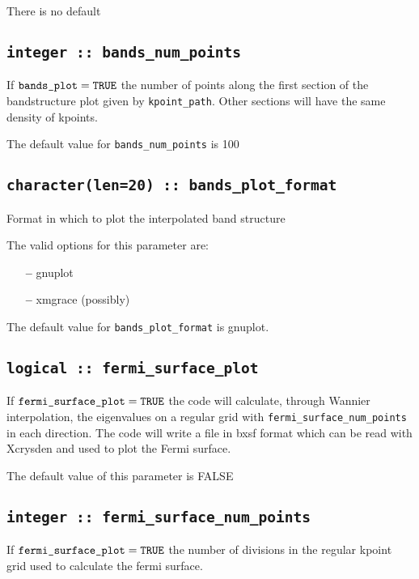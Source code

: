 There is no default

\subsection[bands\_num\_points]{\tt integer :: bands\_num\_points}

If $\verb#bands_plot#=\verb#TRUE#$ the number of points along the first
section of the bandstructure plot given by \verb#kpoint_path#. Other
sections will have the same density of kpoints.

The default value for \verb#bands_num_points# is 100


\subsection[bands\_plot\_format]{\tt character(len=20) :: bands\_plot\_format}

Format in which to plot the interpolated band structure

The valid options for this parameter are:
\begin{itemize}
\item[{\bf --}] gnuplot
\item[{\bf --}] xmgrace (possibly)
\end{itemize}

The default value for \verb#bands_plot_format# is gnuplot.


\subsection[fermi\_surface\_plot]{\tt logical :: fermi\_surface\_plot}

If $\verb#fermi_surface_plot#=\verb#TRUE#$ the code will calculate,
through Wannier interpolation, the
eigenvalues on a regular grid with \verb#fermi_surface_num_points# in
each direction. The code will write a file in bxsf format which can be
read with Xcrysden and used to plot the Fermi surface.

The default value of this parameter is FALSE


\subsection[fermi\_surface\_num\_points]{\tt integer :: fermi\_surface\_num\_points}

If $\verb#fermi_surface_plot#=\verb#TRUE#$ the number of divisions in
the regular kpoint grid used to calculate the fermi surface.

